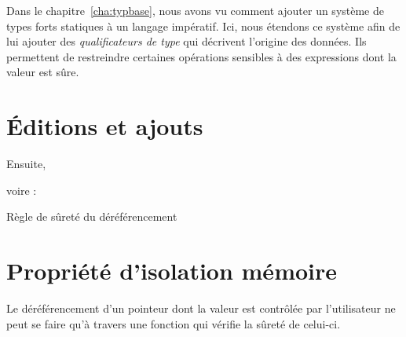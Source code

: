 Dans le chapitre~\ref{cha:typbase}, nous avons vu comment ajouter un système de
types forts statiques à un langage impératif. Ici, nous étendons ce système afin
de lui ajouter des \emph{qualificateurs de type} qui décrivent l'origine des
données. Ils permettent de restreindre certaines opérations sensibles à des
expressions dont la valeur est sûre.

\section{Éditions et ajouts}


Ensuite,


voire :


Règle de sûreté du déréférencement

\begin{mathpar}
\end{mathpar}

\section{Propriété d'isolation mémoire}

Le déréférencement d'un pointeur dont la valeur est contrôlée par l'utilisateur
ne peut se faire qu'à travers une fonction qui vérifie la sûreté de celui-ci.
